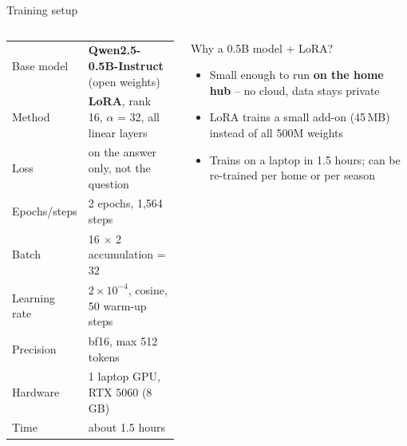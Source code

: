\documentclass[aspectratio=169,11pt]{beamer}
\begin{document}
\begin{frame}{Training setup}
  \begin{columns}[T]
    \begin{column}{0.52\textwidth}
      \small
      \begin{tabularx}{\linewidth}{@{}>{\color{ink2}}l L@{}}
        \toprule
        Base model    & \textbf{Qwen2.5-0.5B-Instruct} (open weights) \\
        Method        & \textbf{LoRA}, rank 16, $\alpha$ = 32, all linear layers \\
        Loss          & on the answer only, not the question \\
        Epochs/steps  & 2 epochs, 1,564 steps \\
        Batch         & 16 $\times$ 2 accumulation = 32 \\
        Learning rate & $2\times10^{-4}$, cosine, 50 warm-up steps \\
        Precision     & bf16, max 512 tokens \\
        Hardware      & 1 laptop GPU, RTX 5060 (8\,GB) \\
        Time          & about 1.5 hours \\
        \bottomrule
      \end{tabularx}
    \end{column}
    \begin{column}{0.44\textwidth}
      \begin{block}{Why a 0.5B model + LoRA?}
        \small
        \begin{itemize}\setlength{\itemsep}{0.4em}
          \item Small enough to run \textbf{on the home hub} -- no cloud, data stays private
          \item LoRA trains a small add-on (45\,MB) instead of all 500M weights
          \item Trains on a laptop in 1.5 hours; can be re-trained per home or per season
        \end{itemize}
      \end{block}
    \end{column}
  \end{columns}
\end{frame}
\end{document}
